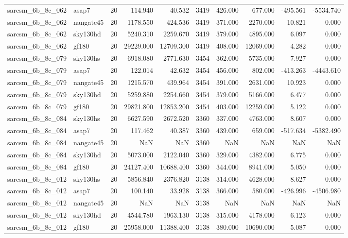 \begin{tabular}{llrrrrrrrr}
sarcsm\_6b\_8c\_062 & asap7 & 20 & 114.940 & 40.532 & 3419 & 426.000 & 677.000 & -495.561 & -5534.740 \\
sarcsm\_6b\_8c\_062 & nangate45 & 20 & 1178.550 & 424.536 & 3419 & 371.000 & 2270.000 & 10.821 & 0.000 \\
sarcsm\_6b\_8c\_062 & sky130hd & 20 & 5240.310 & 2259.670 & 3419 & 379.000 & 4895.000 & 6.097 & 0.000 \\
sarcsm\_6b\_8c\_062 & gf180 & 20 & 29229.000 & 12709.300 & 3419 & 408.000 & 12069.000 & 4.282 & 0.000 \\
sarcsm\_6b\_8c\_079 & sky130hs & 20 & 6918.080 & 2771.630 & 3454 & 362.000 & 5735.000 & 7.927 & 0.000 \\
sarcsm\_6b\_8c\_079 & asap7 & 20 & 122.014 & 42.632 & 3454 & 456.000 & 802.000 & -413.263 & -4443.610 \\
sarcsm\_6b\_8c\_079 & nangate45 & 20 & 1215.570 & 439.964 & 3454 & 391.000 & 2631.000 & 10.923 & 0.000 \\
sarcsm\_6b\_8c\_079 & sky130hd & 20 & 5259.880 & 2254.660 & 3454 & 379.000 & 5166.000 & 6.477 & 0.000 \\
sarcsm\_6b\_8c\_079 & gf180 & 20 & 29821.800 & 12853.200 & 3454 & 403.000 & 12259.000 & 5.122 & 0.000 \\
sarcsm\_6b\_8c\_084 & sky130hs & 20 & 6627.590 & 2672.520 & 3360 & 337.000 & 4763.000 & 8.607 & 0.000 \\
sarcsm\_6b\_8c\_084 & asap7 & 20 & 117.462 & 40.387 & 3360 & 439.000 & 659.000 & -517.634 & -5382.490 \\
sarcsm\_6b\_8c\_084 & nangate45 & 20 & NaN & NaN & 3360 & NaN & NaN & NaN & NaN \\
sarcsm\_6b\_8c\_084 & sky130hd & 20 & 5073.000 & 2122.040 & 3360 & 329.000 & 4382.000 & 6.775 & 0.000 \\
sarcsm\_6b\_8c\_084 & gf180 & 20 & 24127.400 & 10688.400 & 3360 & 344.000 & 8941.000 & 5.050 & 0.000 \\
sarcsm\_6b\_8c\_012 & sky130hs & 20 & 5856.840 & 2376.820 & 3138 & 314.000 & 4628.000 & 8.627 & 0.000 \\
sarcsm\_6b\_8c\_012 & asap7 & 20 & 100.140 & 33.928 & 3138 & 366.000 & 580.000 & -426.996 & -4506.980 \\
sarcsm\_6b\_8c\_012 & nangate45 & 20 & NaN & NaN & 3138 & NaN & NaN & NaN & NaN \\
sarcsm\_6b\_8c\_012 & sky130hd & 20 & 4544.780 & 1963.130 & 3138 & 315.000 & 4178.000 & 6.123 & 0.000 \\
sarcsm\_6b\_8c\_012 & gf180 & 20 & 25958.000 & 11388.400 & 3138 & 380.000 & 10690.000 & 5.087 & 0.000 \\

\end{tabular}
